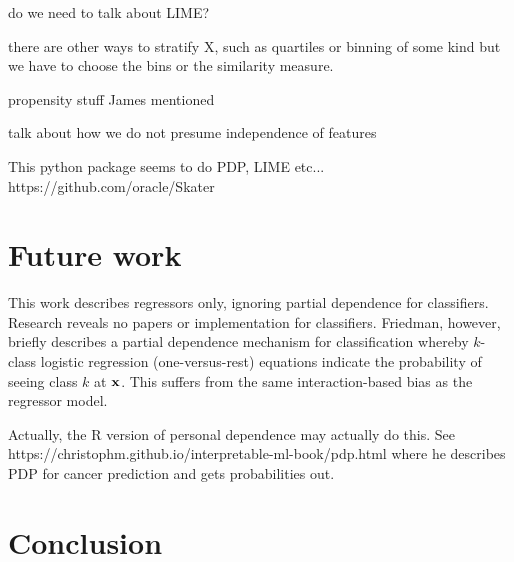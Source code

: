 \documentclass[12pt]{article}
\begin{document}
do we need to talk about LIME?

there are other ways to stratify X, such as quartiles or binning of some kind but we have to choose the bins or the similarity measure.

propensity stuff James mentioned

talk about how we do not presume independence of features
 
This python package seems to do PDP, LIME etc... https://github.com/oracle/Skater

\section{Future work}

This work describes regressors only, ignoring partial dependence for classifiers.  Research reveals no papers or implementation for classifiers. Friedman, however, briefly describes a partial dependence mechanism for classification whereby $k$-class logistic regression (one-versus-rest) equations indicate the probability of seeing class $k$ at $\bf{x}$.  This suffers from the same interaction-based bias as the regressor model.

Actually, the R version of personal dependence may actually do this. See https://christophm.github.io/interpretable-ml-book/pdp.html where he describes PDP for cancer prediction and gets probabilities out.

\section{Conclusion}
\label{sec:conc}




\end{document}

